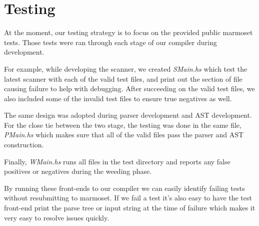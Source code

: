\documentclass[12pt,letterpaper]{article}
\begin{document}
\section{Testing}
At the moment, our testing strategy is to focus on the provided public marmoset tests. Those tests were ran through each stage of our compiler during development.

For example, while developing the scanner, we created \emph{SMain.hs} which test the latest scanner with each of the valid test files, and print out the section of file causing failure to help with debugging. After succeeding on the valid test files, we also included some of the invalid test files to ensure true negatives as well.

The same design was adopted during parser development and AST development. For the close tie between the two stage, the testing was done in the same file, \emph{PMain.hs} which makes sure that all of the valid files pass the parser and AST construction.

Finally, \emph{WMain.hs} runs all files in the test directory and reports any false positives or negatives during the weeding phase.

By running these front-ends to our compiler we can easily identify failing tests without resubmitting to marmoset. If we fail a test it's also easy to have the test front-end print the parse tree or input string at the time of failure which makes it very easy to resolve issues quickly.
\end{document}
